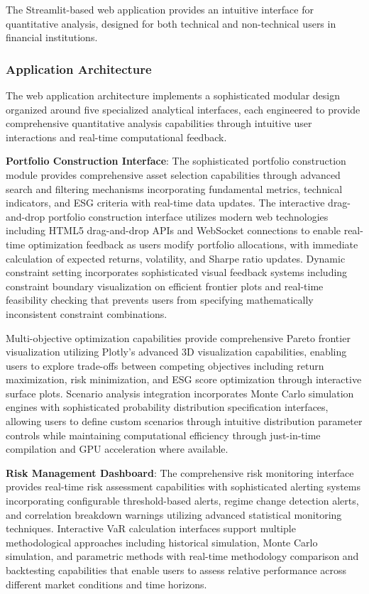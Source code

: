 \documentclass[12pt,a4paper]{article}
\theoremstyle{definition}
\theoremstyle{remark}
\begin{document}
The Streamlit-based web application provides an intuitive interface for quantitative analysis, designed for both technical and non-technical users in financial institutions.

\subsubsection{Application Architecture}

The web application architecture implements a sophisticated modular design organized around five specialized analytical interfaces, each engineered to provide comprehensive quantitative analysis capabilities through intuitive user interactions and real-time computational feedback.

\textbf{Portfolio Construction Interface}: The sophisticated portfolio construction module provides comprehensive asset selection capabilities through advanced search and filtering mechanisms incorporating fundamental metrics, technical indicators, and ESG criteria with real-time data updates. The interactive drag-and-drop portfolio construction interface utilizes modern web technologies including HTML5 drag-and-drop APIs and WebSocket connections to enable real-time optimization feedback as users modify portfolio allocations, with immediate calculation of expected returns, volatility, and Sharpe ratio updates. Dynamic constraint setting incorporates sophisticated visual feedback systems including constraint boundary visualization on efficient frontier plots and real-time feasibility checking that prevents users from specifying mathematically inconsistent constraint combinations.

Multi-objective optimization capabilities provide comprehensive Pareto frontier visualization utilizing Plotly's advanced 3D visualization capabilities, enabling users to explore trade-offs between competing objectives including return maximization, risk minimization, and ESG score optimization through interactive surface plots. Scenario analysis integration incorporates Monte Carlo simulation engines with sophisticated probability distribution specification interfaces, allowing users to define custom scenarios through intuitive distribution parameter controls while maintaining computational efficiency through just-in-time compilation and GPU acceleration where available.

\textbf{Risk Management Dashboard}: The comprehensive risk monitoring interface provides real-time risk assessment capabilities with sophisticated alerting systems incorporating configurable threshold-based alerts, regime change detection alerts, and correlation breakdown warnings utilizing advanced statistical monitoring techniques. Interactive VaR calculation interfaces support multiple methodological approaches including historical simulation, Monte Carlo simulation, and parametric methods with real-time methodology comparison and backtesting capabilities that enable users to assess relative performance across different market conditions and time horizons.
\end{document}
